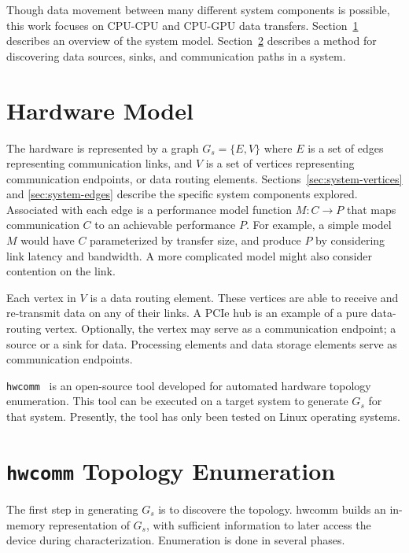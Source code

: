 Though data movement between many different system components is possible, this work focuses on CPU-CPU and CPU-GPU data transfers.
Section~\ref{sec:hardware-model} describes an overview of the system model.
Section~\ref{sec:hardware-enumeration} describes a method for discovering data sources, sinks, and communication paths in a system.

\section{Hardware Model}
\label{sec:hardware-model}

The hardware is represented by a graph $G_s = \{E,V\}$ where $E$ is a set of edges representing communication links, and $V$ is a set of vertices representing communication endpoints, or data routing elements.
Sections~\ref{sec:system-vertices} and \ref{sec:system-edges} describe the specific system components explored.
Associated with each edge is a performance model function $M: C \rightarrow P$ that maps communication $C$ to an achievable performance $P$.
For example, a simple model $M$ would have $C$ parameterized by transfer size, and produce $P$ by considering link latency and bandwidth.
A more complicated model might also consider contention on the link.

Each vertex in $V$ is a data routing element.
These vertices are able to receive and re-transmit data on any of their links.
A PCIe hub  is an example of a pure data-routing vertex.
Optionally, the vertex may serve as a communication endpoint; a source or a sink for data.
Processing elements and data storage elements serve as communication endpoints.

\texttt{hwcomm}~\cite{pearson2018hwcomm} is an open-source tool developed for automated hardware topology enumeration.
This tool can be executed on a target system to generate $G_s$ for that system.
Presently, the tool has only been tested on Linux operating systems.



%
%
\section{\texttt{hwcomm} Topology Enumeration}
\label{sec:hardware-enumeration}

The first step in generating $G_s$ is to discovere the topology.
hwcomm builds an in-memory representation of $G_s$, with sufficient information to later access the device during characterization.
Enumeration is done in several phases.

